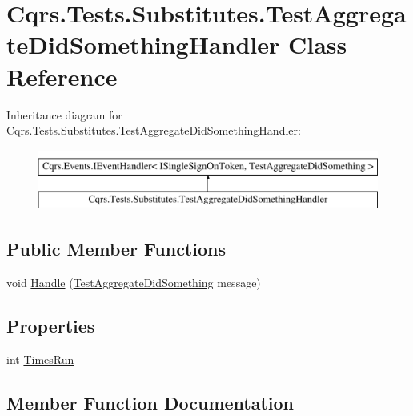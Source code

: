 \hypertarget{classCqrs_1_1Tests_1_1Substitutes_1_1TestAggregateDidSomethingHandler}{}\section{Cqrs.\+Tests.\+Substitutes.\+Test\+Aggregate\+Did\+Something\+Handler Class Reference}
\label{classCqrs_1_1Tests_1_1Substitutes_1_1TestAggregateDidSomethingHandler}
Inheritance diagram for Cqrs.\+Tests.\+Substitutes.\+Test\+Aggregate\+Did\+Something\+Handler\+:\begin{figure}[H]
\begin{center}
\leavevmode
\includegraphics[height=2.000000cm]{classCqrs_1_1Tests_1_1Substitutes_1_1TestAggregateDidSomethingHandler}
\end{center}
\end{figure}
\subsection*{Public Member Functions}
\begin{DoxyCompactItemize}
\item 
void \hyperlink{classCqrs_1_1Tests_1_1Substitutes_1_1TestAggregateDidSomethingHandler_a614df627f6424696bf8117995c9ad3fa}{Handle} (\hyperlink{classCqrs_1_1Tests_1_1Substitutes_1_1TestAggregateDidSomething}{Test\+Aggregate\+Did\+Something} message)
\end{DoxyCompactItemize}
\subsection*{Properties}
\begin{DoxyCompactItemize}
\item 
int \hyperlink{classCqrs_1_1Tests_1_1Substitutes_1_1TestAggregateDidSomethingHandler_a8b1e5833823a488446f350db2a3ed58b}{Times\+Run}
\end{DoxyCompactItemize}


\subsection{Member Function Documentation}
\mbox{\label{classCqrs_1_1Tests_1_1Substitutes_1_1TestAggregateDidSomethingHandler_a614df627f6424696bf8117995c9ad3fa}} 
